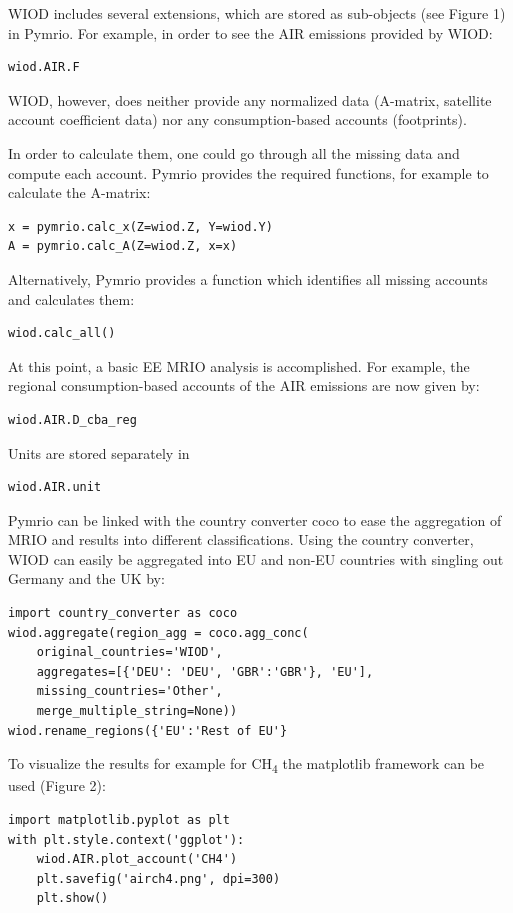 \documentclass{jors}
\begin{document}
WIOD includes several extensions, which are stored as sub-objects (see Figure 1) in Pymrio. 
For example, in order to see the AIR emissions provided by WIOD:

\begin{lstlisting}
wiod.AIR.F
\end{lstlisting}

WIOD, however, does neither provide any normalized data (A-matrix, satellite account coefficient data) nor any consumption-based accounts (footprints).

In order to calculate them, one could go through all the missing data and compute each account. 
Pymrio provides the required functions, for example to calculate the A-matrix:
\begin{lstlisting}
x = pymrio.calc_x(Z=wiod.Z, Y=wiod.Y)
A = pymrio.calc_A(Z=wiod.Z, x=x)
\end{lstlisting}

Alternatively, Pymrio provides a function which identifies all missing accounts and calculates them:
\begin{lstlisting}
wiod.calc_all()
\end{lstlisting}

At this point, a basic EE MRIO analysis is accomplished. For example, the regional consumption-based accounts of the AIR emissions are now given by:
\begin{lstlisting}
wiod.AIR.D_cba_reg
\end{lstlisting}

Units are stored separately in 
\begin{lstlisting}
wiod.AIR.unit
\end{lstlisting}

Pymrio can be linked with the country converter coco \cite{stadler2017_country} to ease the aggregation of MRIO and results into different classifications.
Using the country converter, WIOD can easily be aggregated into EU and non-EU countries with singling out Germany and the UK by:

\begin{lstlisting}
import country_converter as coco
wiod.aggregate(region_agg = coco.agg_conc(
    original_countries='WIOD',
    aggregates=[{'DEU': 'DEU', 'GBR':'GBR'}, 'EU'],
    missing_countries='Other',
    merge_multiple_string=None))
wiod.rename_regions({'EU':'Rest of EU'}
\end{lstlisting}

To visualize the results for example for CH\textsubscript{4} the matplotlib framework \cite{hunter2007_Matplotlib} can be used (Figure 2):
\begin{lstlisting}
import matplotlib.pyplot as plt
with plt.style.context('ggplot'):
    wiod.AIR.plot_account('CH4')
    plt.savefig('airch4.png', dpi=300)
    plt.show()
\end{lstlisting}
\end{document}
